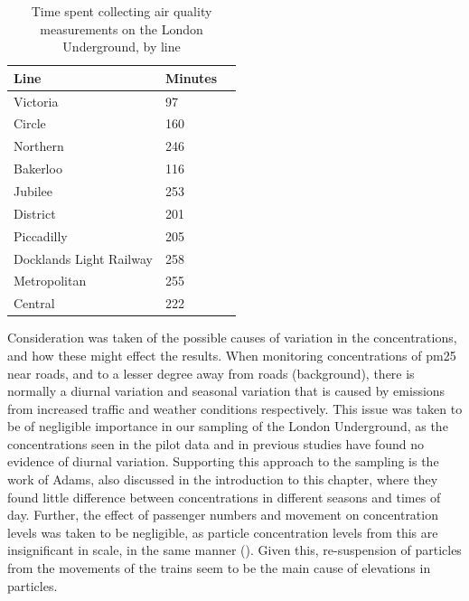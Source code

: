\begin{table}[H]
\caption{Time spent collecting air quality measurements on the London Underground, by line}
\centering
    \begin{tabular}{ | l | l | l |}
    \hline 
    \bfseries{Line} & \bfseries{Minutes} \\ \hline
       Victoria                & 97    \\ \hline
        Circle                  & 160   \\ \hline
        Northern                & 246   \\ \hline
        Bakerloo                & 116   \\ \hline
        Jubilee                 & 253   \\ \hline
        District                & 201   \\ \hline
        Piccadilly              & 205   \\ \hline
        Docklands Light Railway & 258   \\ \hline
        Metropolitan            & 255   \\ \hline
        Central                 & 222   \\ \hline
        \end{tabular}
\label{tab:time_on_the_underground}
\end{table}

Consideration was taken of the possible causes of variation in the concentrations, and how these might effect the results. When monitoring concentrations of \gls{pm25} near roads, and to a lesser degree away from roads (background), there is normally a diurnal variation and seasonal variation that is caused by emissions from increased traffic and weather conditions respectively. This issue was taken to be of negligible importance in our sampling of the London Underground, as the concentrations seen in the pilot data and in previous studies have found no evidence of diurnal variation. Supporting this approach to the sampling is the work of Adams, also discussed in the introduction to this chapter, where they found little difference between concentrations in different seasons and times of day. Further, the effect of passenger numbers and movement on concentration levels was taken to be negligible, as particle concentration levels from this are insignificant in scale, in the same manner (\cite{Ferro2004a}). Given this, re-suspension of particles from the movements of the trains seem to be the main cause of elevations in particles.

